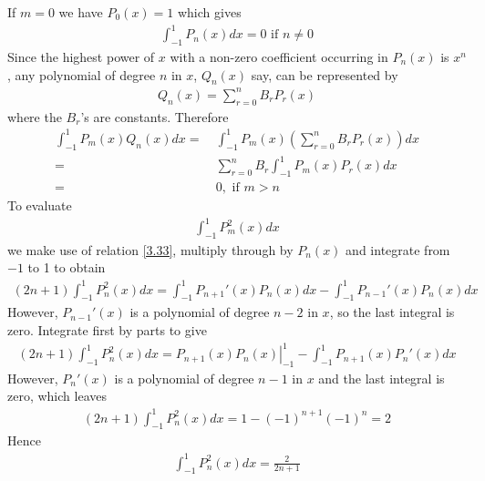 \documentclass[a4paper]{article}
\numberwithin{equation}{section}
\begin{document}
If $m=0$ we have $P_0\left(x\right)=1$ which gives
\begin{align}
\int_{ - 1}^1 {{P_n}\left( x \right)dx}  = 0\mbox{ if }n\ne 0
\end{align}
Since the highest power of $x$ with a non-zero coefficient occurring in $P_n\left(x\right)$ is $x^n$, any polynomial of degree $n$ in $x$, $Q_n\left(x\right)$ say, can be represented by
\begin{align}
{Q_n}\left( x \right) = \sum\limits_{r = 0}^n {{B_r}{P_r}\left( x \right)} 
\end{align}
where the $B_r$'s are constants. Therefore
\begin{align}
\int_{ - 1}^1 {{P_m}\left( x \right){Q_n}\left( x \right)dx}  =&\ \int_{ - 1}^1 {{P_m}\left( x \right)\left( {\sum\limits_{r = 0}^n {{B_r}{P_r}\left( x \right)} } \right)dx} \\
 =&\ \sum\limits_{r = 0}^n {{B_r}\int_{ - 1}^1 {{P_m}\left( x \right){P_r}\left( x \right)dx} } \\
 =&\ 0,\mbox{ if } m > n
\end{align}
To evaluate
\begin{align}
\int_{ - 1}^1 {P_m^2\left( x \right)dx} 
\end{align}
we make use of relation \eqref{3.33}, multiply through by $P_n\left(x\right)$ and integrate from $-1$ to 1 to obtain
\begin{align}
\left( {2n + 1} \right)\int_{ - 1}^1 {P_n^2\left( x \right)dx}  = \int_{ - 1}^1 {{P_{n + 1}}'\left( x \right){P_n}\left( x \right)dx}  - \int_{ - 1}^1 {{P_{n - 1}}'\left( x \right){P_n}\left( x \right)dx} 
\end{align}
However, $P_{n-1}'\left(x\right)$ is a polynomial of degree $n-2$ in $x$, so the last integral is zero. Integrate first by parts to give
\begin{align}
\left( {2n + 1} \right)\int_{ - 1}^1 {P_n^2\left( x \right)dx}  = \left. {{P_{n + 1}}\left( x \right){P_n}\left( x \right)} \right|_{ - 1}^1 - \int_{ - 1}^1 {{P_{n + 1}}\left( x \right){P_n}'\left( x \right)dx} 
\end{align}
However, $P_n'\left(x\right)$ is a polynomial of degree $n-1$ in $x$ and the last integral is zero, which leaves
\begin{align}
\left( {2n + 1} \right)\int_{ - 1}^1 {P_n^2\left( x \right)dx}  = 1 - {\left( { - 1} \right)^{n + 1}}{\left( { - 1} \right)^n} = 2
\end{align}
Hence
\begin{align}
\label{3.54}
\int_{ - 1}^1 {P_n^2\left( x \right)dx}  = \frac{2}{{2n + 1}}
\end{align}
\end{document}

